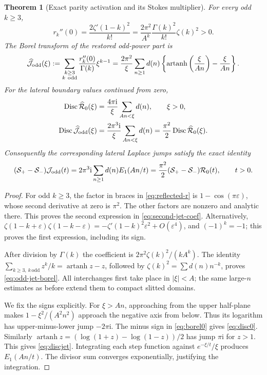 \documentclass[11pt,a4paper]{article}
\numberwithin{equation}{section}
\newtheorem{theorem}{Theorem}[section]
\theoremstyle{definition}\newtheorem{definition}[theorem]{Definition}
\theoremstyle{remark}\newtheorem{remark}[theorem]{Remark}
\newcommand{\Disc}{\operatorname{Disc}}
\newcommand{\artanh}{\operatorname{artanh}}
\newcommand{\eps}{\varepsilon}
\newcommand{\ii}{\mathrm i}
\newcommand{\B}{\widehat{\mathcal R}}
\newcommand{\Sc}{\mathcal S}
\begin{document}
\begin{theorem}[Exact parity activation and its Stokes multiplier]
\label{thm:parity}
For every odd $k\ge3$,
\begin{equation}\label{eq:second-jet-coef}
 r_k''(0)=\frac{2\zeta'(1-k)^2}{k!}
 =\frac{2\pi^2}{A^k}\frac{\Gamma(k)^2}{k!}\zeta(k)^2>0.
\end{equation}
The Borel transform of the restored odd-power part is
\begin{equation}\label{eq:odd-jet-borel}
 \widehat{\mathcal J}_{\rm odd}(\xi)
 :=\sum_{\substack{k\ge3\\k\ {\rm odd}}}
       {r_k''(0)\over\Gamma(k)}\xi^{k-1}
 =\frac{2\pi^2}{\xi}\sum_{n\ge1}d(n)
 \left\{\artanh\left(\frac\xi{An}\right)-\frac\xi{An}\right\}.
\end{equation}
For the lateral boundary values continued from zero,
\begin{align}
 \Disc\B_0(\xi)
 &=\frac{4\pi\ii}{\xi}\sum_{An<\xi}d(n),\qquad \xi>0,
 \label{eq:disc0}\\
 \Disc\widehat{\mathcal J}_{\rm odd}(\xi)
 &=\frac{2\pi^3\ii}{\xi}\sum_{An<\xi}d(n)
 =\frac{\pi^2}{2}\Disc\B_0(\xi).
 \label{eq:discjet}
\end{align}
Consequently the corresponding lateral Laplace jumps satisfy the exact
identity
\begin{equation}\label{eq:jet-jump}
 (\Sc_+-\Sc_-)\mathcal J_{\rm odd}(t)
 =2\pi^3\ii\sum_{n\ge1}d(n)E_1(An/t)
 =\frac{\pi^2}{2}(\Sc_+-\Sc_-)\mathcal R_0(t),\qquad t>0.
\end{equation}
\end{theorem}
\begin{proof}
For odd $k\ge3$, the factor in braces in \eqref{eq:reflected-r}
is $1-\cos(\pi\eps)$, whose second derivative at zero is $\pi^2$.
The other factors are nonzero and analytic there. This proves the
second expression in \eqref{eq:second-jet-coef}. Alternatively,
$\zeta(1-k+\eps)\zeta(1-k-\eps)
=-\zeta'(1-k)^2\eps^2+O(\eps^4)$, and $(-1)^k=-1$;
this proves the first expression, including its sign.

After division by $\Gamma(k)$ the coefficient is
$2\pi^2\zeta(k)^2/(kA^k)$. The identity
$\sum_{k\ge3,\ k\,\mathrm{odd}}z^k/k=\artanh z-z$,
followed by $\zeta(k)^2=\sum d(n)n^{-k}$, proves
\eqref{eq:odd-jet-borel}. All interchanges first take place in
$|\xi|<A$; the same large-$n$ estimates as before extend them to
compact slitted domains.

We fix the signs explicitly. For $\xi>An$, approaching from the upper
half-plane makes $1-\xi^2/(A^2n^2)$ approach the negative axis from
below. Thus its logarithm has upper-minus-lower jump $-2\pi\ii$.
The minus sign in \eqref{eq:borel0} gives \eqref{eq:disc0}.
Similarly
$\artanh z=(\log(1+z)-\log(1-z))/2$ has jump $\pi\ii$ for
$z>1$. This gives \eqref{eq:discjet}. Integrating each step function
against $e^{-\xi/t}/\xi$ produces $E_1(An/t)$.
The divisor sum converges exponentially, justifying the integration.
\end{proof}
\end{document}
